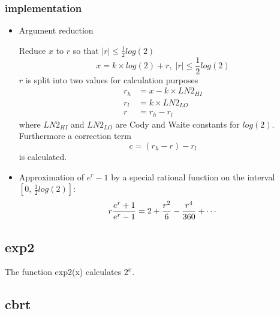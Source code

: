 \documentclass[10pt,a4paper]{article}
\numberwithin{equation}{subsection}
\begin{document}
\subsubsection{implementation}
\begin{itemize}
\item Argument reduction

    Reduce $x$ to $r$ so that $ |r| \le \frac{1}{2} log(2) $
    \begin{equation}
        x = k \times log(2) + r, \; |r| \le \frac{1}{2} log(2)
    \end{equation}
    $r$ is split into two values for calculation purposes
    \[
       \begin{aligned}
       r_h &= x - k \times LN2_{HI} \\
       r_l &= k \times LN2_{LO} \\
       r &= r_h - r_l
       \end{aligned}
    \]
    where $LN2_{HI}$ and $LN2_{LO}$ are Cody and Waite constants for $log(2)$.
    Furthermore a correction term
    \[
        c = (r_h - r) - r_l
    \]
    is calculated.

\item Approximation of $e^r-1$ by a special rational function on the interval
    $[0,\,\frac{1}{2}log(2)]$:
    \[
        r \frac{e^{r}+1}{e^{r}-1} =
        2+{{r^2}\over{6}}-{{r^4}\over{360}}+\cdots
    \]

\end{itemize}

\subsection{exp2}
The function exp2(x) calculates $ 2^x $.

\subsection{cbrt}
\end{document}
